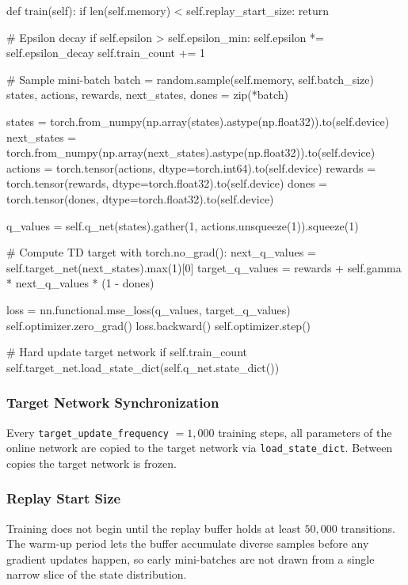 \documentclass[12pt,a4paper]{report}
\begin{document}
\begin{pycode}
def train(self):
    if len(self.memory) < self.replay_start_size:
        return

    # Epsilon decay
    if self.epsilon > self.epsilon_min:
        self.epsilon *= self.epsilon_decay
    self.train_count += 1

    # Sample mini-batch
    batch = random.sample(self.memory, self.batch_size)
    states, actions, rewards, next_states, dones = zip(*batch)

    states      = torch.from_numpy(np.array(states).astype(np.float32)).to(self.device)
    next_states = torch.from_numpy(np.array(next_states).astype(np.float32)).to(self.device)
    actions     = torch.tensor(actions, dtype=torch.int64).to(self.device)
    rewards     = torch.tensor(rewards, dtype=torch.float32).to(self.device)
    dones       = torch.tensor(dones,   dtype=torch.float32).to(self.device)

    q_values = self.q_net(states).gather(1, actions.unsqueeze(1)).squeeze(1)

    # Compute TD target
    with torch.no_grad():
        next_q_values   = self.target_net(next_states).max(1)[0]
        target_q_values = rewards + self.gamma * next_q_values * (1 - dones)

    loss = nn.functional.mse_loss(q_values, target_q_values)
    self.optimizer.zero_grad()
    loss.backward()
    self.optimizer.step()

    # Hard update target network
    if self.train_count %
        self.target_net.load_state_dict(self.q_net.state_dict())
\end{pycode}

\subsubsection*{Target Network Synchronization}

Every \texttt{target\_update\_frequency} $= 1{,}000$ training steps, all parameters of
the online network are copied to the target network via \texttt{load\_state\_dict}.
Between copies the target network is frozen.

\subsubsection*{Replay Start Size}

Training does not begin until the replay buffer holds at least $50{,}000$ transitions.
The warm-up period lets the buffer accumulate diverse samples before any gradient
updates happen, so early mini-batches are not drawn from a single narrow slice of
the state distribution.
\end{document}
